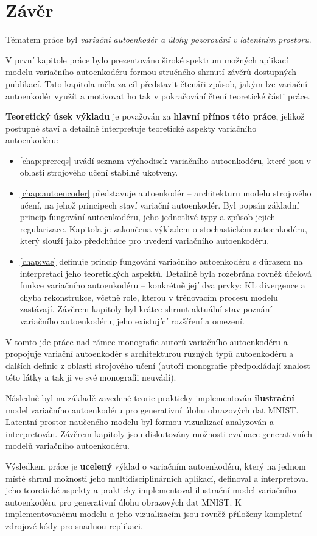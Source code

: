 \chapter*{Závěr}

Tématem práce byl \emph{variační autoenkodér a úlohy pozorování v latentním prostoru}.

V první kapitole práce bylo prezentováno široké spektrum možných aplikací modelu variačního autoenkodéru formou stručného shrnutí závěrů dostupných publikací.
Tato kapitola měla za cíl představit čtenáři způsob, jakým lze variační autoenkodér využít a motivovat ho tak v pokračování čtení teoretické části práce.

\textbf{Teoretický úsek výkladu} je považován za \textbf{hlavní přínos této práce}, jelikož postupně staví a detailně interpretuje teoretické aspekty variačního autoenkodéru:
\begin{itemize}
    \item \autoref{chap:prereqs} uvádí seznam východisek variačního autoenkodéru, které jsou v oblasti strojového učení stabilně ukotveny.
    \item \autoref{chap:autoencoder} představuje autoenkodér – architekturu modelu strojového učení, na jehož principech staví variační autoenkodér. Byl popsán základní princip fungování autoenkodéru, jeho jednotlivé typy a způsob jejich regularizace. Kapitola je zakončena výkladem o stochastickém autoenkodéru, který slouží jako předchůdce pro uvedení variačního autoenkodéru. 
    \item \autoref{chap:vae} definuje princip fungování variačního autoenkodéru s důrazem na interpretaci jeho teoretických aspektů. Detailně byla rozebrána rovněž účelová funkce variačního autoenkodéru – konkrétně její dva prvky: KL divergence a chyba rekonstrukce, včetně role, kterou v trénovacím procesu modelu zastávají. Závěrem kapitoly byl krátce shrnut aktuální stav poznání variačního autoenkodéru, jeho existující rozšíření a omezení.
\end{itemize}

V tomto jde práce nad rámec monografie autorů variačního autoenkodéru \textcite{Kingma2019} a propojuje variační autoenkodér s architekturou různých typů autoenkodéru a dalších definic z oblasti strojového učení (autoři monografie předpokládají znalost této látky a tak ji ve své monografii neuvádí).

Následně byl na základě zavedené teorie prakticky implementován \textbf{ilustrační} model variačního autoenkodéru pro generativní úlohu obrazových dat MNIST.
Latentní prostor naučeného modelu byl formou vizualizací analyzován a interpretován. Závěrem kapitoly jsou diskutovány možnosti evaluace generativních modelů variačního autoenkodéru.

Výsledkem práce je \textbf{ucelený} výklad o variačním autoenkodéru, který na jednom místě shrnul možnosti jeho multidisciplinárních aplikací, definoval a interpretoval jeho teoretické aspekty a prakticky implementoval ilustrační model variačního autoenkodéru pro generativní úlohu obrazových dat MNIST.
K implementovanému modelu a jeho vizualizacím jsou rovněž přiloženy kompletní zdrojové kódy pro snadnou replikaci.